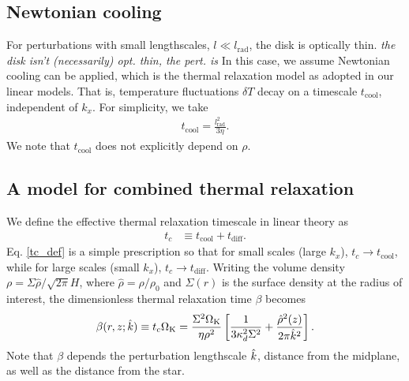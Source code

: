 \subsection{Newtonian cooling}\label{newton_cool}
For perturbations with small lengthscales, $l\ll l_\mathrm{rad}$, 
the disk is optically thin.
\emph{the disk isn't (necessarily) opt. thin, the pert. is}
 In this case, we assume 
Newtonian cooling can be applied, which is the thermal
relaxation model as adopted in our linear models. That is, temperature
fluctuations $\delta T$ decay on a timescale $t_\mathrm{cool}$,
independent of $k_x$. For simplicity, we take  
\begin{align}
  t_\mathrm{cool} = \frac{l_\mathrm{rad}^2}{3\eta}. 
\end{align}
We note that $t_\mathrm{cool}$ does not explicitly depend on $\rho$. 

\subsection{A model for combined thermal relaxation}\label{toy_relax}
We define the effective thermal relaxation timescale in linear theory as
\begin{align}\label{tc_def}
  t_c &\equiv t_\mathrm{cool} + t _\mathrm{diff}. %
\end{align}
Eq. \ref{tc_def} is a simple prescription so
that for small scales (large $k_x$), $t_c\to t_\mathrm{cool}$, while
for large scales (small $k_x$), $t_c\to t_\mathrm{diff}$. Writing the
volume density $\rho = \Sigma\hat{\rho}/\sqrt{2\pi}H$, where
$\hat{\rho} = \rho/\rho_0$ and $\Sigma(r)$ is the surface density at the
radius of interest, the dimensionless thermal
relaxation time $\beta$ becomes 
\begin{align}\label{real_beta}
  \beta(r,z;\hat{k}) \equiv t_c\Omega_{\rm K} =
  \frac{\Sigma^2\Omega_{\rm K}}{\eta\rho^2}\left[\frac{1}{3\kappa_d^2\Sigma^2} 
    + \frac{\hat{\rho}^2(z)}{2\pi \hat{k}^2}\right].
\end{align}
Note that $\beta$ depends the perturbation lengthscale $\hat{k}$,
distance from the midplane, as well as the distance from the star.  

